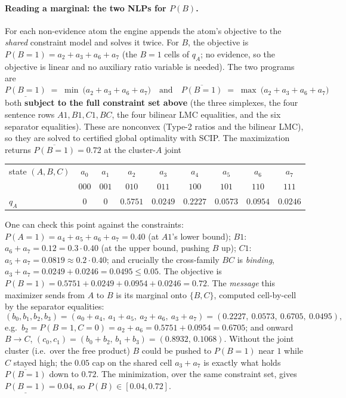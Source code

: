 \documentclass[11pt]{article}
\begin{document}
\paragraph{Reading a marginal: the two NLPs for $P(B)$.} For each non-evidence atom the engine
appends the atom's objective to the \emph{shared} constraint model and solves it twice. For $B$,
the objective is $P(B{=}1)=a_2+a_3+a_6+a_7$ (the $B{=}1$ cells of $q_A$; no evidence, so the
objective is linear and no auxiliary ratio variable is needed). The two programs are
\[
  \underline{P(B{=}1)} \;=\; \min\ \big(a_2{+}a_3{+}a_6{+}a_7\big)
  \quad\text{and}\quad
  \overline{P(B{=}1)} \;=\; \max\ \big(a_2{+}a_3{+}a_6{+}a_7\big)
\]
both \textbf{subject to the full constraint set above} (the three simplexes, the four sentence
rows $\mathit{A1},\mathit{B1},\mathit{C1},\mathit{BC}$, the four bilinear LMC equalities, and the
six separator equalities). These are nonconvex (Type-2 ratios and the bilinear LMC), so they are
solved to certified global optimality with SCIP. The maximization returns
$\overline{P(B{=}1)}=0.72$ at the cluster-$A$ joint
\begin{center}
\begin{tabular}{lcccccccc}
  \toprule
  state $(A,B,C)$ & $a_0$ & $a_1$ & $a_2$ & $a_3$ & $a_4$ & $a_5$ & $a_6$ & $a_7$ \\
                  & $000$ & $001$ & $010$ & $011$ & $100$ & $101$ & $110$ & $111$ \\
  $q_A$ & $0$ & $0$ & $0.5751$ & $0.0249$ & $0.2227$ & $0.0573$ & $0.0954$ & $0.0246$ \\
  \bottomrule
\end{tabular}
\end{center}
One can check this point against the constraints: $P(A{=}1)=a_4{+}a_5{+}a_6{+}a_7=0.40$
(at $\mathit{A1}$'s lower bound); $\mathit{B1}$: $a_6{+}a_7=0.12=0.3\cdot0.40$ (at the upper
bound, pushing $B$ up); $\mathit{C1}$: $a_5{+}a_7=0.0819\approx0.2\cdot0.40$; and crucially the
cross-family $\mathit{BC}$ is \emph{binding}, $a_3{+}a_7=0.0249{+}0.0246=0.0495\le0.05$. The
objective is $P(B{=}1)=0.5751{+}0.0249{+}0.0954{+}0.0246=0.72$. The \emph{message} this maximizer
sends from $A$ to $B$ is its marginal onto $\{B,C\}$, computed cell-by-cell by the separator
equalities:
\[
  (b_0,b_1,b_2,b_3) = (a_0{+}a_4,\ a_1{+}a_5,\ a_2{+}a_6,\ a_3{+}a_7)
  = (0.2227,\ 0.0573,\ 0.6705,\ 0.0495),
\]
e.g.\ $b_2=P(B{=}1,C{=}0)=a_2{+}a_6=0.5751{+}0.0954=0.6705$; and onward $B\to C$,
$(c_0,c_1)=(b_0{+}b_2,\,b_1{+}b_3)=(0.8932,\,0.1068)$. Without the joint cluster (i.e.\ over the
free product) $B$ could be pushed to $P(B{=}1)$ near $1$ while $C$ stayed high; the $0.05$ cap on
the shared cell $a_3{+}a_7$ is exactly what holds $\overline{P(B{=}1)}$ down to $0.72$. The
minimization, over the same constraint set, gives $\underline{P(B{=}1)}=0.04$, so
$P(B)\in[0.04,0.72]$.
\end{document}
